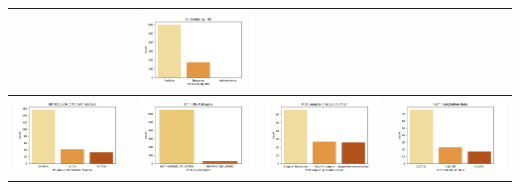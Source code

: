 \begin{table}[!h]
\begin{center}
\begin{tabular}{ |c|c|c|c| }
		& \includegraphics[width=.25\textwidth]{NOTEBOOK/IMAGENES_CRUDAS/24} 
		\\  \hline 
		  \includegraphics[width=.25\textwidth]{NOTEBOOK/IMAGENES_CRUDAS/25} 
		& \includegraphics[width=.25\textwidth]{NOTEBOOK/IMAGENES_CRUDAS/26} 
		& \includegraphics[width=.25\textwidth]{NOTEBOOK/IMAGENES_CRUDAS/27} 
		& \includegraphics[width=.25\textwidth]{NOTEBOOK/IMAGENES_CRUDAS/28}   
		\\  \hline                
	\end{tabular} 
\end{center} 
\end{table}


